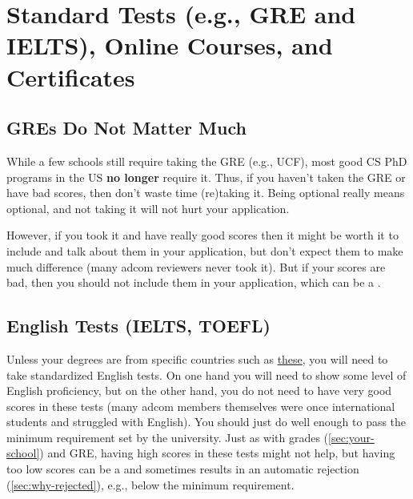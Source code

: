 \documentclass[oneside,11pt,dvipsnames]{book}
\newcommand{\red}[1]{{\color{red}{#1}}}
\begin{document}
\section{Standard Tests (e.g., GRE and IELTS), Online Courses, and Certificates}\label{sec:standard-tests}

\subsection{GREs Do Not Matter Much} While a few schools still require taking the GRE (e.g., UCF), most good CS PhD programs in the US \textbf{no longer} require it. Thus, if you haven't taken the GRE or have bad scores, then don't waste time (re)taking it. Being optional really means optional, and not taking it will not hurt your application.

However, if you took it and have really good scores then it might be worth it to include and talk about them in your application, but don't expect them to make much difference (many adcom reviewers never took it). But if your scores are bad, then you should not include them in your application, which can be a \red{red flag}.

\subsection{English Tests (IELTS, TOEFL)} Unless your degrees are from specific countries such as \href{https://github.com/dynaroars/dynaroars.github.io/wiki/About-Mason#standard-tests-waiver-eligible-countries}{these}, you will need to take standardized English tests. On one hand you will need to show some level of English proficiency, but on the other hand, you do not need to have very good scores in these tests (many adcom members themselves were once international students and struggled with English).
You should just do well enough to pass the minimum requirement set by the university. %
Just as with grades (\autoref{sec:your-school}) and GRE, having high scores in these tests might not help, but having too low scores can be a \red{red flag} and sometimes results in an automatic rejection (\autoref{sec:why-rejected}), e.g., below the minimum requirement.
\end{document}
